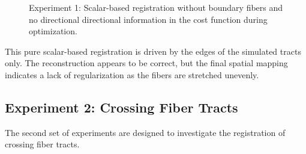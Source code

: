 \documentclass[twocolumn]{svjour3}
\begin{document}
\begin{figure}[!ht]
  \centering \vspace*{-0.4cm} 
  \hspace*{.5cm}
  \caption{Experiment 1: Scalar-based registration without boundary fibers and no directional directional information in the cost function during optimization.}
  \label{fig:straight2wavy_l_boundary_k0}
\end{figure}
This pure scalar-based registration is driven by the edges of the simulated tracts
only. The reconstruction appears to be correct, but the final spatial mapping indicates a
lack of regularization as the fibers are stretched
unevenly.


\subsection{Experiment 2: Crossing Fiber Tracts}
\label{subsec:crossingfiber}

The second set of experiments are designed to investigate the registration of crossing fiber tracts.
\end{document}
